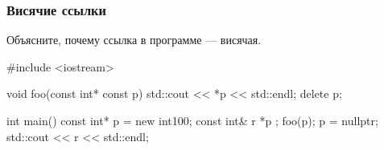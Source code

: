 \documentclass[compress, 8pt, aspectratio=169]{beamer}
\begin{document}
\begin{frame}[fragile]

    \frametitle{Висячие ссылки}

    \begin{task}
        Объясните, почему ссылка в программе --- висячая.
    \end{task}

    \begin{myinplacelisting}[minted language=cpp]
#include <iostream>

void foo(const int* const p) {
    std::cout << *p << std::endl;
    delete p;
}

int main() {
    const int* p = new int{100};
    const int& r { *p };
    foo(p);
    p = nullptr;
    std::cout << r << std::endl;
}
    \end{myinplacelisting}

\end{frame}
\end{document}
